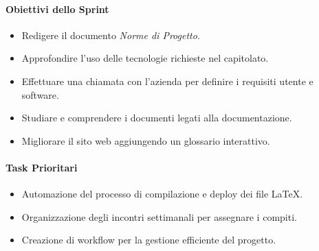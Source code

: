 \documentclass{article}
\begin{document}
                \paragraph{Obiettivi dello Sprint}
                    \begin{itemize}
                        \item Redigere il documento \emph{Norme di Progetto}.
                        \item Approfondire l'uso delle tecnologie richieste nel capitolato.
                        \item Effettuare una chiamata con l'azienda per definire i requisiti utente e software.
                        \item Studiare e comprendere i documenti legati alla documentazione.
                        \item Migliorare il sito web aggiungendo un glossario interattivo.
                    \end{itemize}

                \paragraph{Task Prioritari}
                    \begin{itemize}
                        \item Automazione del processo di compilazione e deploy dei file LaTeX.
                        \item Organizzazione degli incontri settimanali per assegnare i compiti.
                        \item Creazione di workflow per la gestione efficiente del progetto.
                    \end{itemize}

\end{document}

